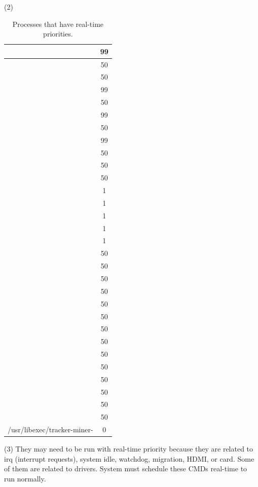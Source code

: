 \documentclass[a4paper]{article}
\begin{document}
(2)
\begin{table}[H]
    \centering
    \begin{tabular}{|c|c|}
        \hline
        [migration/0]&99\\
        \hline
        [idle\_inject/0]&50\\
        \hline
        [idle\_inject/1]&50\\
        \hline
        [migration/1]&99\\
        \hline
        [idle\_inject/2]&50\\
        \hline
        [migration/2]&99\\
        \hline
        [idle\_inject/3]&50\\
        \hline
        [migration/3]&99\\
        \hline
        [watchdogd]&50\\
        \hline
        [irq/69-aerdrv]&50\\
        \hline
        [irq/55-mmc0]&50\\
        \hline
        [v3d\_bin]&1\\
        \hline
        [v3d\_render]&1\\
        \hline
        [v3d\_tfu]&1\\
        \hline
        [v3d\_csd]&1\\
        \hline
        [v3d\_cache\_clean]&1\\
        \hline
        [irq/46-vc4 hdmi]&50\\
        \hline
        [irq/47-vc4 hdmi]&50\\
        \hline
        [irq/43-vc4 hdmi]&50\\
        \hline
        [irq/42-vc4 hdmi]&50\\
        \hline
        [irq/52-vc4 hdmi]&50\\
        \hline
        [irq/53-vc4 hdmi]&50\\
        \hline
        [irq/49-vc4 hdmi]&50\\
        \hline
        [irq/48-vc4 hdmi]&50\\
        \hline
        [card1-crtc0]&50\\
        \hline
        [card1-crtc1]&50\\
        \hline
        [card1-crtc2]&50\\
        \hline
        [card1-crtc3]&50\\
        \hline
        [card1-crtc4]&50\\
        \hline
        [card1-crtc5]&50\\
        \hline
        /usr/libexec/tracker-miner-&0\\
        \hline
    \end{tabular}
    \caption{Processes that have real-time priorities.}
\end{table}
(3) They may need to be run with real-time priority because they are related to irq (interrupt requests), system idle, watchdog, migration, HDMI, or card. Some of them are related to drivers. System must schedule these CMDs real-time to run normally.
\end{document}
